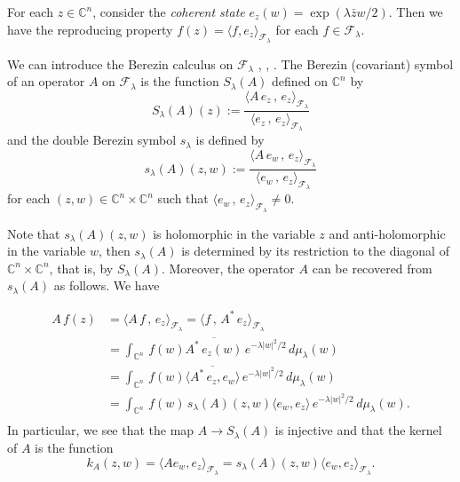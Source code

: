 \documentclass[12pt]{amsart}
\numberwithin{equation}{section}
\begin{document}
For each $z\in {\mathbb C}^n$, consider the \textit {coherent state}
$e_z(w)=\exp (\lambda{\bar z}w/2)$. Then we have the reproducing property
$f(z)=\langle f,e_z\rangle_{{\mathcal F}_{\lambda}}$ for each $f\in {\mathcal
F}_{\lambda}$.

We can introduce the Berezin
calculus on ${\mathcal F}_{\lambda}$ \cite{Be1}, \cite{Be2}, \cite{CaRiv}.
The Berezin (covariant) symbol of an operator $A$ on ${\mathcal
F}_{\lambda}$ is the
function $S_{\lambda}(A)$ defined on ${\mathbb C}^n$ by
\begin{equation*}S_{\lambda}(A)(z):=\frac {\langle A\,e_z\,,\,e_z\rangle_{{\mathcal F}_{\lambda}}}{\langle e_z\,,\,e_z\rangle_{{\mathcal F}_{\lambda}}} \end{equation*}
and the double Berezin symbol $s_{\lambda}$ is defined by
\begin{equation*}s_{\lambda}(A)(z,w):=\frac {\langle A\,e_w\,,\,e_z\rangle_{{\mathcal F}_{\lambda}}}{\langle e_w\,,\,e_z\rangle_{{\mathcal F}_{\lambda}}} \end{equation*}
for each $(z,w)\in {\mathbb C}^n \times {\mathbb C}^n$ such that 
$\langle e_w\,,\,e_z\rangle_{{\mathcal F}_{\lambda}}\not= 0$.

Note that $s_{\lambda}(A)(z,w)$ is holomorphic in the variable $z$ and anti-holomorphic in the variable $w$, then $s_{\lambda}(A)$ is determined by its restriction to the diagonal of ${\mathbb C}^n \times {\mathbb C}^n$, that is, by $S_{\lambda}(A)$. Moreover, the operator $A$ can be recovered from $s_{\lambda}(A)$ as follows. We have

\begin{align*}
A\,f(z)&=\langle A\,f\,,\,e_z \rangle_{{\mathcal F}_{\lambda}}  
  =\langle f\,,\,A^{\ast}\,e_z\rangle_{{\mathcal F}_{\lambda}}  \\
&=\int _{{\mathbb C}^n}\,f(w)\overline {A^{\ast}\,e_z(w)}\,e^{-\lambda \vert
w\vert^2/2}\,d\mu_{\lambda} (w) \\
&=\int _{{\mathbb C}^n}\,f(w)\overline {\langle A^{\ast}\,e_z,e_w\rangle}\,e^{-\lambda \vert
w\vert^2/2}\,d\mu_{\lambda} (w) \\
&=\int _{{\mathbb C}^n} \,f(w)\,s_{\lambda}(A)(z,w)\langle e_w,e_z\rangle\,e^{-\lambda \vert
w\vert^2/2}\,d\mu_{\lambda}(w).\\ 
\end{align*}
In particular, we see that  the map $A\rightarrow S_{\lambda}(A)$ is injective and that the
kernel of $A$ is the function
\begin{equation} k_A(z,w)=\langle Ae_w,e_z\rangle_{{\mathcal F}_{\lambda}}=s_{\lambda}(A)(z,w)\langle e_w,e_z\rangle_{{\mathcal F}_{\lambda}}.\end{equation}
\end{document}
